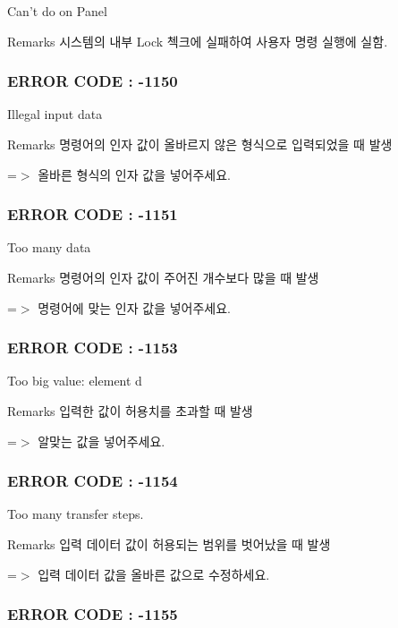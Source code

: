 Can't do on Panel \begin{DoxyRemark}{Remarks}
시스템의 내부 Lock 첵크에 실패하여 사용자 명령 실행에 실함.
\end{DoxyRemark}


 \subsubsection*{E\-R\-R\-O\-R C\-O\-D\-E \-: -\/1150 }

Illegal input data \begin{DoxyRemark}{Remarks}
명령어의 인자 값이 올바르지 않은 형식으로 입력되었을 때 발생 \par
 =$>$ 올바른 형식의 인자 값을 넣어주세요.
\end{DoxyRemark}


 \subsubsection*{E\-R\-R\-O\-R C\-O\-D\-E \-: -\/1151 }

Too many data \begin{DoxyRemark}{Remarks}
명령어의 인자 값이 주어진 개수보다 많을 때 발생 \par
 =$>$ 명령어에 맞는 인자 값을 넣어주세요.
\end{DoxyRemark}


 \subsubsection*{E\-R\-R\-O\-R C\-O\-D\-E \-: -\/1153 }

Too big value\-: element d \begin{DoxyRemark}{Remarks}
입력한 값이 허용치를 초과할 때 발생 \par
 =$>$ 알맞는 값을 넣어주세요.
\end{DoxyRemark}


 \subsubsection*{E\-R\-R\-O\-R C\-O\-D\-E \-: -\/1154 }

Too many transfer steps. \begin{DoxyRemark}{Remarks}
입력 데이터 값이 허용되는 범위를 벗어났을 때 발생 \par
 =$>$ 입력 데이터 값을 올바른 값으로 수정하세요.
\end{DoxyRemark}


 \subsubsection*{E\-R\-R\-O\-R C\-O\-D\-E \-: -\/1155 }

